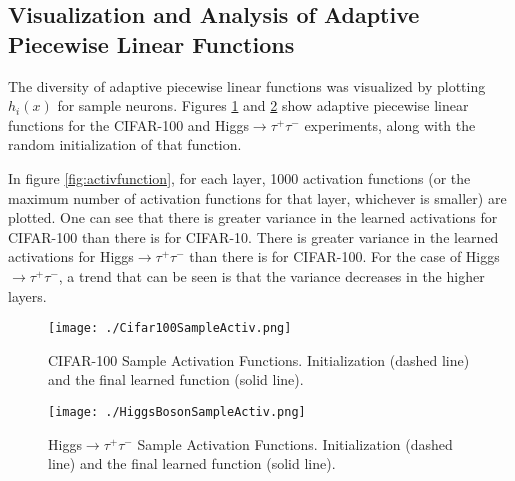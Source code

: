 \documentclass{article} \usepackage{iclr2015,times}
\begin{document}
\subsection{Visualization and Analysis of Adaptive Piecewise Linear Functions}
\label{sec:visualize}
The diversity of adaptive piecewise linear functions was visualized by plotting $h_i(x)$ for sample neurons. Figures \ref{fig:Cifar100SampleActivFunction} and \ref{fig:HiggsBosonSampleActivFunction} show adaptive piecewise linear functions for the CIFAR-100 and Higgs$\rightarrow\tau^+\tau^-$ experiments, along with the random initialization of that function.

In figure \ref{fig:activfunction}, for each layer, 1000 activation functions (or the maximum number of activation functions for that layer, whichever is smaller) are plotted. One can see that there is greater variance in the learned activations for CIFAR-100 than there is for CIFAR-10. There is greater variance in the learned activations for Higgs$\rightarrow\tau^+\tau^-$ than there is for CIFAR-100. For the case of Higgs$\rightarrow\tau^+\tau^-$, a trend that can be seen is that the variance decreases in the higher layers.

\begin{figure}[h]
\center
\texttt{[image: ./Cifar100SampleActiv.png]}
\caption{CIFAR-100 Sample Activation Functions. Initialization (dashed line) and the final learned function (solid line).}
\label{fig:Cifar100SampleActivFunction}
\end{figure}

\begin{figure}[h]
\center
\texttt{[image: ./HiggsBosonSampleActiv.png]}
\caption{Higgs$\rightarrow\tau^+\tau^-$ Sample Activation Functions. Initialization (dashed line) and the final learned function (solid line).}
\label{fig:HiggsBosonSampleActivFunction}
\end{figure}
\end{document}
